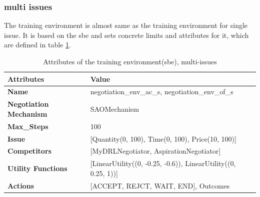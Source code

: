 \subsubsection{multi issues}
The training environment is almost same as the training environment for single issue. It is based on the \gls{sbe} and sets concrete limits and attributes for it, which are defined in table \ref{tab:attributes-sbe-multi-issues}.

\begin{table}[htbp]
\centering
\begin{tabular}{l l l} \toprule
\bfseries \textbf{Attributes}      & \bfseries \textbf{Value}             \\ \midrule
\textbf{Name}                    & negotiation\_env\_ac\_s, negotiation\_env\_of\_s                     \\
\textbf{Negotiation Mechanism}   & SAOMechanism                                                         \\
\textbf{Max\_Steps}              & 100                                                                  \\
\textbf{Issue}             	     & [Quantity(0, 100), Time(0, 100), Price(10, 100)]                     \\
\textbf{Competitors}             & [MyDRLNegotiator, AspirationNegotiator]                              \\
\textbf{Utility Functions}       & [LinearUtility((0, -0.25, -0.6)), LinearUtility((0, 0.25, 1))]       \\
\textbf{Actions}                 & [ACCEPT, REJCT, WAIT, END], Outcomes                                 \\
\bottomrule
\end{tabular}
\caption{Attributes of the training environment(sbe), multi-issues}
\label{tab:attributes-sbe-multi-issues}
\end{table}

